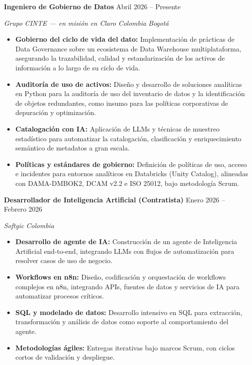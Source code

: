 \documentclass[letterpaper,10pt]{article}
\newcommand{\sizeTitle}  {\fontsize{10.6}{12.7}\selectfont}
\newcommand{\sizeContact}{\fontsize{9}{11}\selectfont}
\newcommand{\sizeWhere}  {\fontsize{9.5}{11.4}\selectfont}
\newcommand{\md}{\,\textperiodcentered\,}                  %
\newcommand{\cvrole}[2]{%
  \needspace{3\baselineskip}%
  {\color{cvdark}\sizeTitle\bfseries #1}%
  \hfill{\color{cvgray}\sizeContact #2}\par
  \vspace{1pt}%
}
\newcommand{\cvwhere}[1]{%
  {\color{cvgray}\sizeWhere\itshape #1}\par
  \vspace{3pt}%
}
\begin{document}
\cvrole{Ingeniero de Gobierno de Datos}{Abril 2026 -- Presente}
\cvwhere{Grupo CINTE --- en misión en Claro Colombia\md Bogotá}
\begin{itemize}
  \item \textbf{Gobierno del ciclo de vida del dato:} Implementación de prácticas
        de Data Governance sobre un ecosistema de Data Warehouse multiplataforma,
        asegurando la trazabilidad, calidad y estandarización de los activos de
        información a lo largo de su ciclo de vida.
  \item \textbf{Auditoría de uso de activos:} Diseño y desarrollo de soluciones
        analíticas en Python para la auditoría de uso del inventario de datos y
        la identificación de objetos redundantes, como insumo para las políticas
        corporativas de depuración y optimización.
  \item \textbf{Catalogación con IA:} Aplicación de LLMs y técnicas de muestreo
        estadístico para automatizar la catalogación, clasificación y
        enriquecimiento semántico de metadatos a gran escala.
  \item \textbf{Políticas y estándares de gobierno:} Definición de políticas de
        uso, acceso e incidentes para entornos analíticos en Databricks (Unity
        Catalog), alineadas con DAMA-DMBOK2, DCAM v2.2 e ISO 25012, bajo
        metodología Scrum.
\end{itemize}
\vspace{7pt}

\cvrole{Desarrollador de Inteligencia Artificial (Contratista)}{Enero 2026 -- Febrero 2026}
\cvwhere{Softgic\md Colombia}
\begin{itemize}
  \item \textbf{Desarrollo de agente de IA:} Construcción de un agente de
        Inteligencia Artificial end-to-end, integrando LLMs con flujos de
        automatización para resolver casos de uso de negocio.
  \item \textbf{Workflows en n8n:} Diseño, codificación y orquestación de
        workflows complejos en n8n, integrando APIs, fuentes de datos y servicios
        de IA para automatizar procesos críticos.
  \item \textbf{SQL y modelado de datos:} Desarrollo intensivo en SQL para
        extracción, transformación y análisis de datos como soporte al
        comportamiento del agente.
  \item \textbf{Metodologías ágiles:} Entregas iterativas bajo marcos Scrum, con
        ciclos cortos de validación y despliegue.
\end{itemize}
\vspace{7pt}
\end{document}
